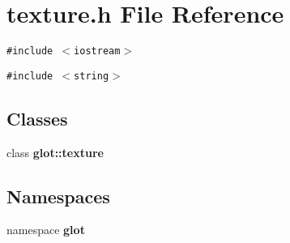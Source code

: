 \section{texture.h File Reference}
\label{texture_8h}
{\tt \#include $<$iostream$>$}\par
{\tt \#include $<$string$>$}\par
\subsection*{Classes}
\begin{CompactItemize}
\item 
class {\bf glot::texture}
\end{CompactItemize}
\subsection*{Namespaces}
\begin{CompactItemize}
\item 
namespace {\bf glot}
\end{CompactItemize}
